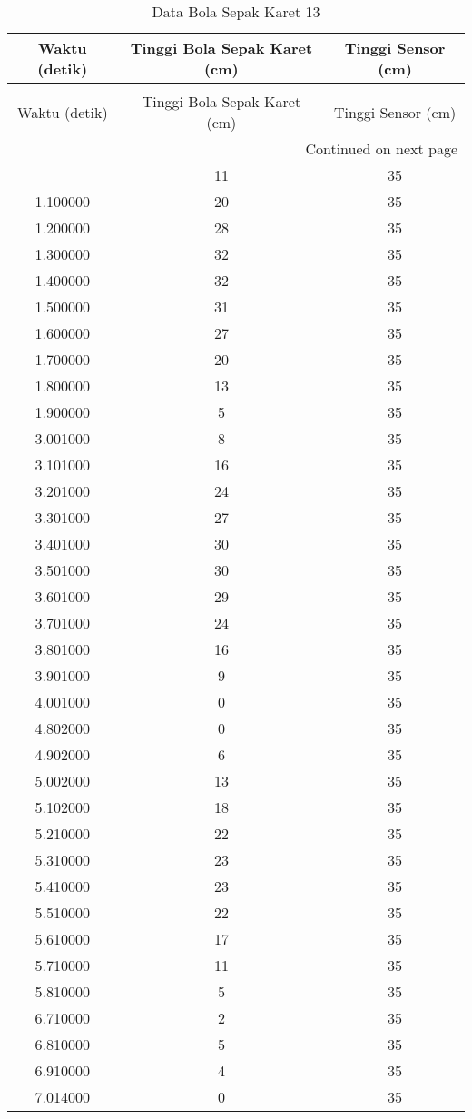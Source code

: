 \begin{longtable}[htbp]{|c|c|c|}
\caption{Data Bola Sepak Karet 13} \\
\hline
Waktu (detik) & Tinggi Bola Sepak Karet (cm) & Tinggi Sensor (cm) \\ \hline
\endfirsthead
\caption[]{Data Bola Sepak Karet 13} \\
\hline
Waktu (detik) & Tinggi Bola Sepak Karet (cm) & Tinggi Sensor (cm) \\ \hline
\endhead
\multicolumn{3}{r}{Continued on next page} \\
\endfoot
\endlastfoot
1.000000 & 11 & 35 \\ \hline
1.100000 & 20 & 35 \\ \hline
1.200000 & 28 & 35 \\ \hline
1.300000 & 32 & 35 \\ \hline
1.400000 & 32 & 35 \\ \hline
1.500000 & 31 & 35 \\ \hline
1.600000 & 27 & 35 \\ \hline
1.700000 & 20 & 35 \\ \hline
1.800000 & 13 & 35 \\ \hline
1.900000 & 5 & 35 \\ \hline
3.001000 & 8 & 35 \\ \hline
3.101000 & 16 & 35 \\ \hline
3.201000 & 24 & 35 \\ \hline
3.301000 & 27 & 35 \\ \hline
3.401000 & 30 & 35 \\ \hline
3.501000 & 30 & 35 \\ \hline
3.601000 & 29 & 35 \\ \hline
3.701000 & 24 & 35 \\ \hline
3.801000 & 16 & 35 \\ \hline
3.901000 & 9 & 35 \\ \hline
4.001000 & 0 & 35 \\ \hline
4.802000 & 0 & 35 \\ \hline
4.902000 & 6 & 35 \\ \hline
5.002000 & 13 & 35 \\ \hline
5.102000 & 18 & 35 \\ \hline
5.210000 & 22 & 35 \\ \hline
5.310000 & 23 & 35 \\ \hline
5.410000 & 23 & 35 \\ \hline
5.510000 & 22 & 35 \\ \hline
5.610000 & 17 & 35 \\ \hline
5.710000 & 11 & 35 \\ \hline
5.810000 & 5 & 35 \\ \hline
6.710000 & 2 & 35 \\ \hline
6.810000 & 5 & 35 \\ \hline
6.910000 & 4 & 35 \\ \hline
7.014000 & 0 & 35 \\ \hline
\end{longtable}
